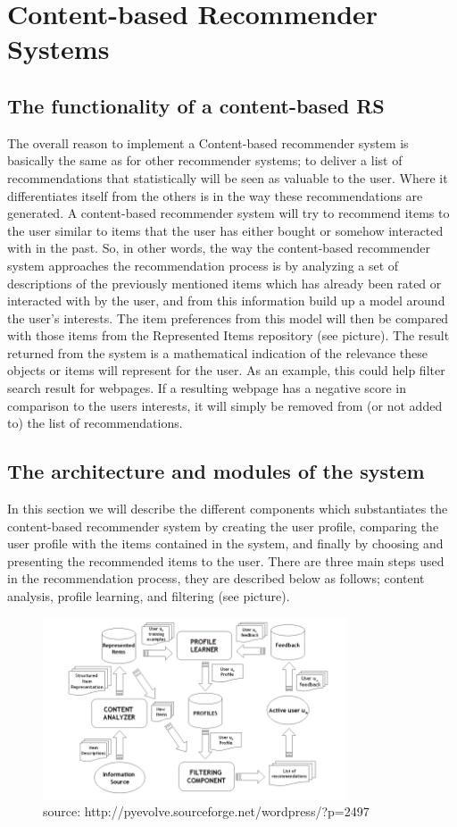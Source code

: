 \section{Content-based Recommender Systems}

\subsection{The functionality of a content-based RS}
The overall reason to implement a Content-based recommender system is basically the same as for other recommender systems; to deliver a list of recommendations that statistically will be seen as valuable to the user. Where it differentiates itself from the others is in the way these recommendations are generated. A content-based recommender system will try to recommend items to the user similar to items that the user has either bought or somehow interacted with in the past. So, in other words, the way the content-based recommender system approaches the recommendation process is by analyzing a set of descriptions of the previously mentioned items which has already been rated or interacted with by the user, and from this information build up a model around the user’s interests. The item preferences from this model will then be compared with those items from the Represented Items repository (see picture). The result returned from the system is a mathematical indication of the relevance these objects or items will represent for the user. As an example, this could help filter search result for webpages. If a resulting webpage has a negative score in comparison to the users interests, it will simply be removed from (or not added to) the list of recommendations.

\subsection{The architecture and modules of the system}
In this section we will describe the different components which substantiates the content-based recommender system by creating the user profile, comparing the user profile with the items contained in the system, and finally by choosing and presenting the recommended items to the user. 
There are three main steps used in the recommendation process, they are described below as follows; content analysis, profile learning, and filtering (see picture).

\begin{figure}[ht!]
\centering
\includegraphics[width=90mm]{Pictures/contentdescription.png}
\caption{source: http://pyevolve.sourceforge.net/wordpress/?p=2497}
\label{contentdescription}
\end{figure}

